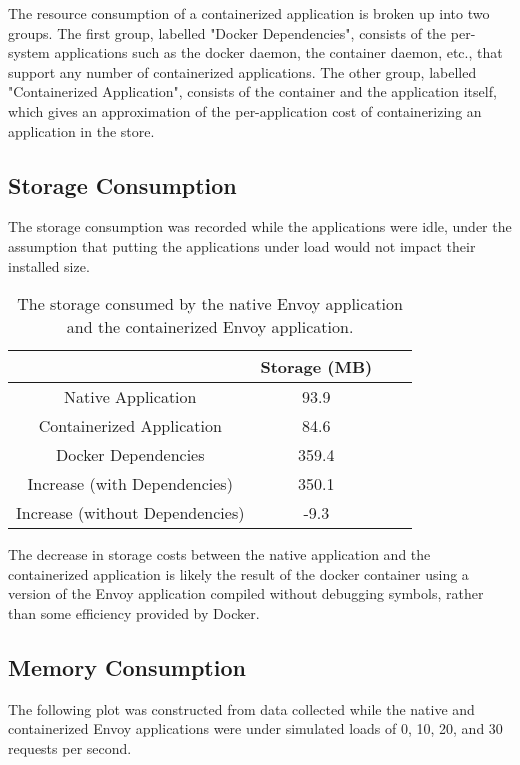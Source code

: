 \documentclass{article}
\begin{document}
The resource consumption of a containerized application is broken up into two groups. The first group, labelled "Docker Dependencies", consists of the per-system applications such as the docker daemon, the container daemon, etc., that support any number of containerized applications. The other group, labelled "Containerized Application", consists of the container and the application itself, which gives an approximation of the per-application cost of containerizing an application in the store.

\subsection{Storage Consumption}
The storage consumption was recorded while the applications were idle, under the assumption that putting the applications under load would not impact their installed size.

\begin{table}[H]
\begin{tabular}{ |c|c|c|c| }
 \hline
   & Storage (MB)\\ 
 \hline
 Native Application & 93.9 \\
 \hline
 Containerized Application & 84.6 \\
 \hline
 Docker Dependencies & 359.4\\
 \hline\hline
 Increase (with Dependencies) & 350.1 \\
 \hline
 Increase (without Dependencies) & -9.3 \\
 \hline
\end{tabular}
\caption{The storage consumed by the native Envoy application and the containerized Envoy application.}
\label{storage-consumption}
\end{table}

The decrease in storage costs between the native application and the containerized application is likely the result of the docker container using a version of the Envoy application compiled without debugging symbols, rather than some efficiency provided by Docker.

\subsection{Memory Consumption}
The following plot was constructed from data collected while the native and containerized Envoy applications were under simulated loads of 0, 10, 20, and 30 requests per second.
\end{document}
